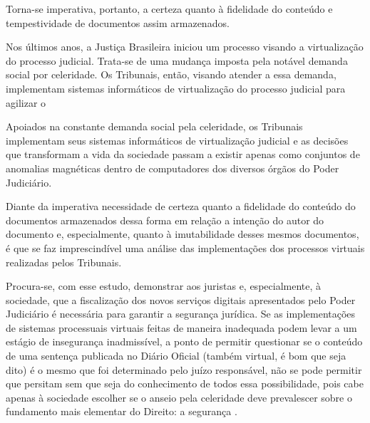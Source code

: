   Torna-se imperativa, portanto, a certeza quanto à fidelidade do
  conteúdo e tempestividade de documentos assim armazenados.\par



	Nos últimos anos, a Justiça Brasileira iniciou um processo visando a virtualização do processo judicial. Trata-se de uma mudança imposta pela notável demanda social por celeridade. Os Tribunais, então, visando atender a essa demanda, implementam sistemas informáticos de virtualização do processo judicial para agilizar o 

  Apoiados na constante demanda social pela celeridade, os
  Tribunais implementam seus sistemas informáticos de
  virtualização judicial e as decisões que transformam a vida da
  sociedade passam a existir apenas como conjuntos de anomalias
  magnéticas dentro de computadores dos diversos órgãos do Poder
  Judiciário.\par
    
    Diante da imperativa necessidade de certeza quanto a fidelidade do conteúdo do documentos armazenados dessa forma em relação a intenção do autor do documento e, especialmente, quanto à imutabilidade desses mesmos documentos, é que se faz imprescindível uma análise das implementações dos processos virtuais realizadas pelos Tribunais. \par
	
	Procura-se, com esse estudo, demonstrar aos juristas e, especialmente, à sociedade, que a fiscalização dos novos serviços digitais apresentados pelo Poder Judiciário é necessária para garantir a segurança jurídica. Se as implementações de sistemas processuais virtuais feitas de maneira inadequada podem levar a um estágio de insegurança inadmissível, a ponto de permitir questionar se o conteúdo de uma sentença publicada no Diário Oficial (também virtual, é bom que seja dito)  é o mesmo que foi determinado pelo juízo responsável, não se pode permitir que persitam sem que seja do conhecimento de todos essa possibilidade, pois cabe apenas à sociedade escolher se o anseio pela celeridade deve prevalescer sobre o fundamento mais elementar do Direito: a segurança .\par
